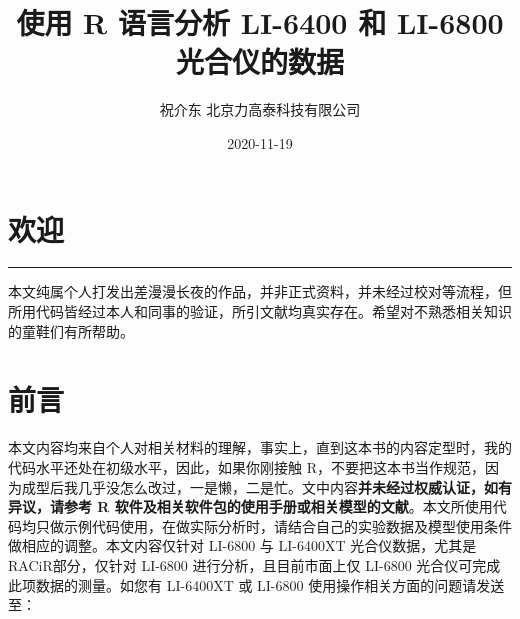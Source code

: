 \documentclass[
]{krantz}
\title{使用 R 语言分析 LI-6400 和 LI-6800 光合仪的数据}
\author{祝介东 北京力高泰科技有限公司}
\date{2020-11-19}
\begin{document}
\maketitle





\thispagestyle{empty}

\setlength{\abovedisplayskip}{-5pt}
\setlength{\abovedisplayshortskip}{-5pt}

{
\hypersetup{linkcolor=}
\setcounter{tocdepth}{2}
\tableofcontents
}
\listoftables
\listoffigures
\hypertarget{welcome}{%
\chapter*{欢迎}\label{welcome}}


\begin{center}\rule{0.5\linewidth}{0.5pt}\end{center}

本文纯属个人打发出差漫漫长夜的作品，并非正式资料，并未经过校对等流程，但所用代码皆经过本人和同事的验证，所引文献均真实存在。希望对不熟悉相关知识的童鞋们有所帮助。

\frontmatter

\hypertarget{frontmatter}{%
\chapter*{前言}\label{frontmatter}}


本文内容均来自个人对相关材料的理解，事实上，直到这本书的内容定型时，我的代码水平还处在初级水平，因此，如果你刚接触 R，不要把这本书当作规范，因为成型后我几乎没怎么改过，一是懒，二是忙。文中内容\textbf{并未经过权威认证，如有异议，请参考 R 软件及相关软件包的使用手册或相关模型的文献}。本文所使用代码均只做示例代码使用，在做实际分析时，请结合自己的实验数据及模型使用条件做相应的调整。本文内容仅针对
LI-6800 与 LI-6400XT 光合仪数据，尤其是 RACiR\texttrademark 部分，仅针对 LI-6800
进行分析，且目前市面上仅 LI-6800 光合仪可完成此项数据的测量。如您有 LI-6400XT 或 LI-6800 使用操作相关方面的问题请发送至：
\end{document}
